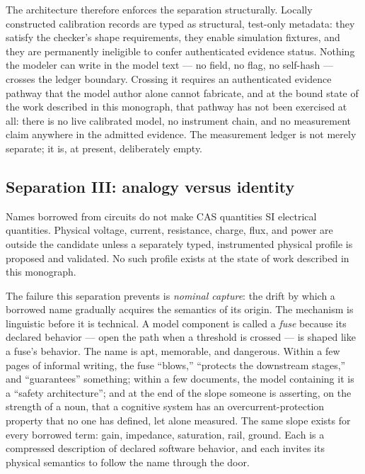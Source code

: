 The architecture therefore enforces the separation structurally. Locally
constructed calibration records are typed as structural, test-only metadata:
they satisfy the checker's shape requirements, they enable simulation
fixtures, and they are permanently ineligible to confer authenticated
evidence status. Nothing the modeler can write in the model text --- no
field, no flag, no self-hash --- crosses the ledger boundary. Crossing it
requires an authenticated evidence pathway that the model author alone
cannot fabricate, and at the bound state of the work described in this
monograph, that pathway has not been exercised at all: there is no live
calibrated model, no instrument chain, and no measurement claim anywhere in
the admitted evidence. The measurement ledger is not merely separate; it is,
at present, deliberately empty.

\subsection{Separation III: analogy versus identity}\label{ch01:sep:analogy}

\begin{ruleenv}\label{ch01:rule:analogy}
Names borrowed from circuits do not make CAS quantities SI electrical
quantities. Physical voltage, current, resistance, charge, flux, and power
are outside the candidate unless a separately typed, instrumented physical
profile is proposed and validated. No such profile exists at the state of
work described in this monograph.
\end{ruleenv}

The failure this separation prevents is \emph{nominal capture}: the drift by
which a borrowed name gradually acquires the semantics of its origin. The
mechanism is linguistic before it is technical. A model component is called a
\emph{fuse} because its declared behavior --- open the path when a threshold
is crossed --- is shaped like a fuse's behavior. The name is apt, memorable,
and dangerous. Within a few pages of informal writing, the fuse ``blows,''
``protects the downstream stages,'' and ``guarantees'' something; within a
few documents, the model containing it is a ``safety architecture''; and at
the end of the slope someone is asserting, on the strength of a noun, that a
cognitive system has an overcurrent-protection property that no one has
defined, let alone measured. The same slope exists for every borrowed term:
gain, impedance, saturation, rail, ground. Each is a compressed description
of declared software behavior, and each invites its physical semantics to
follow the name through the door.

